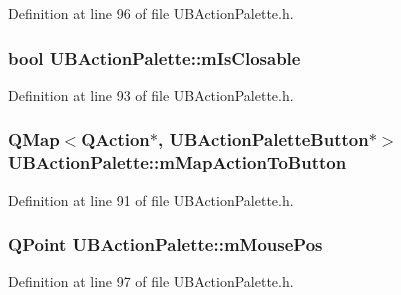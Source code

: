 Definition at line 96 of file U\-B\-Action\-Palette.\-h.

\hypertarget{class_u_b_action_palette_a7cacdc4a079b01dd9f8a93d407158b34}{
\subsubsection[{m\-Is\-Closable}]{\setlength{\rightskip}{0pt plus 5cm}bool U\-B\-Action\-Palette\-::m\-Is\-Closable\hspace{0.3cm}{\ttfamily [protected]}}}\label{de/dc5/class_u_b_action_palette_a7cacdc4a079b01dd9f8a93d407158b34}


Definition at line 93 of file U\-B\-Action\-Palette.\-h.

\hypertarget{class_u_b_action_palette_a4278be12faa1ca4cbbb360fb360a12d1}{
\subsubsection[{m\-Map\-Action\-To\-Button}]{\setlength{\rightskip}{0pt plus 5cm}Q\-Map$<$Q\-Action$\ast$, {\bf U\-B\-Action\-Palette\-Button}$\ast$$>$ U\-B\-Action\-Palette\-::m\-Map\-Action\-To\-Button\hspace{0.3cm}{\ttfamily [protected]}}}\label{de/dc5/class_u_b_action_palette_a4278be12faa1ca4cbbb360fb360a12d1}


Definition at line 91 of file U\-B\-Action\-Palette.\-h.

\hypertarget{class_u_b_action_palette_a8df7d8b1f26b417c8646de24b0a025af}{
\subsubsection[{m\-Mouse\-Pos}]{\setlength{\rightskip}{0pt plus 5cm}Q\-Point U\-B\-Action\-Palette\-::m\-Mouse\-Pos\hspace{0.3cm}{\ttfamily [protected]}}}\label{de/dc5/class_u_b_action_palette_a8df7d8b1f26b417c8646de24b0a025af}


Definition at line 97 of file U\-B\-Action\-Palette.\-h.

